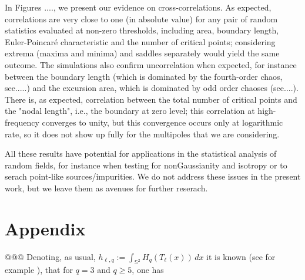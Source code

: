 \documentclass[aps,prd,showpacs,superscriptaddress,groupedaddress]{revtex4-1}  %
\begin{document}
In Figures ...., we present our evidence on cross-correlations. As expected, correlations are very close to one (in absolute value) for any pair of random statistics evaluated at non-zero thresholds, including area, boundary length, Euler-Poincar\'e characteristic and the number of critical points; considering extrema (maxima and minima) and saddles separately would yield the same outcome. The simulations also confirm uncorrelation when expected, for instance between the boundary length (which is dominated by the fourth-order chaos, see.....) and the excursion area, which is dominated by odd order chaoses (see....). There is, as expected, correlation between the total number of critical points and the "nodal length", i.e., the boundary at zero level; this correlation at high-frequency converges to unity, but this convergence occurs only at logarithmic rate, so it does not show up fully for the multipoles that we are considering.

All these results have potential for applications in the statistical analysis of random fields, for instance when testing for nonGaussianity and isotropy or to serach point-like sources/impurities. We do not address these issues in the present work, but we leave them as avenues for further reserach.





\section{Appendix}
@@@
Denoting, as usual, $h_{\ell,q} :=\int_{\mathbb{S}^2} H_q(T_\ell(x)) \,dx$
it is known (see for example \cite{M e W 2012}), that for $q=3$ and $q\geq 5$, one has
\end{document}

